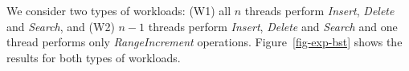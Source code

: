 We consider two types of workloads: (W1) all $n$ threads perform \textit{Insert}, \textit{Delete} and \textit{Search}, and (W2) $n-1$ threads perform \textit{Insert}, \textit{Delete} and \textit{Search} and one thread performs only \textit{RangeIncrement} operations.
Figure~\ref{fig-exp-bst} shows the results for both types of workloads.


